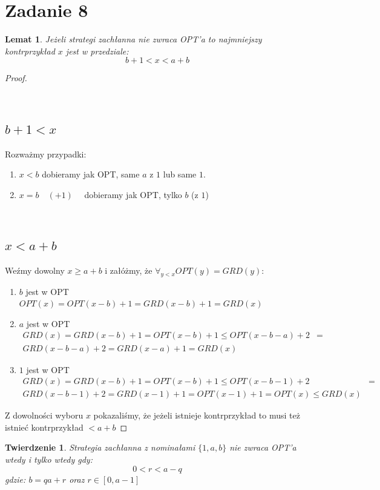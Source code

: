 \documentclass{article}
\newtheorem{lemma}{Lemat}
\newtheorem{theorem}{Twierdzenie}
\begin{document}
\section{Zadanie 8}
\begin{lemma}
Jeżeli strategi zachłanna nie zwraca OPT'a to najmniejszy kontrprzykład $x$ jest w przedziale:
$$
b + 1 < x < a + b
$$
\end{lemma}
\begin{proof}
\subsection*{\\$b+1 < x$}
Rozważmy przypadki:
\begin{enumerate}
    \item $x < b$ \quad\quad\quad\quad dobieramy jak OPT, same $a$ z $1$ lub same $1$.
    \item $x = b \quad(+ 1)\quad $ dobieramy jak OPT, tylko $b$ (z $1$)
\end{enumerate}
\subsection*{\\$x < a + b$}
Weźmy dowolny $x \geq a + b$ i załóżmy, że $\forall_{y < x}OPT(y) = GRD(y)$:
\begin{enumerate}
    \item $b$ jest w OPT \quad $OPT(x) = OPT(x-b) + 1 = GRD(x-b) + 1 = GRD(x)$
    \item $a$ jest w OPT \quad \begin{align*}GRD(x) = GRD(x-b)+1 =  OPT(x-b) + 1 \leq OPT(x-b-a) + 2 &=\\ GRD(x-b-a) +2  = GRD(x-a) + 1  = GRD(x)\end{align*}
    \item $1$ jest w OPT \quad \begin{align*}GRD(x) = GRD(x-b) +1 =OPT(x-b) + 1 \leq OPT(x-b-1) + 2 &=\\ GRD(x-b-1) +2  = GRD(x-1) + 1  = OPT(x-1) + 1 = OPT(x) \leq GRD(x)\end{align*}
\end{enumerate}
Z dowolności wyboru $x$ pokazaliśmy, że jeżeli istnieje kontrprzykład to musi też istnieć kontrprzykład $< a+b$
\end{proof}
\clearpage
\begin{theorem}
Strategia zachłanna z nominałami $\{1,a,b\}$ nie zwraca OPT'a wtedy i tylko wtedy gdy:
$$
0 < r < a - q
$$
gdzie: $b = qa + r$ oraz $r \in [0,a-1]$
\end{theorem}
\end{document}
